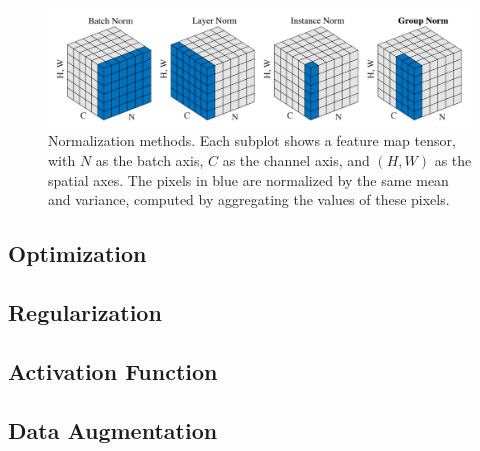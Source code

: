 \documentclass[a4paper]{article}
\theoremstyle{definition}
\theoremstyle{plain}
\begin{document}
\begin{figure}[H]
    \centering
    \includegraphics[scale=0.4]{figure/normalization.png}
    \caption{Normalization methods. Each subplot shows a feature map tensor, with $N$ as the batch axis, $C$ as the channel axis, and $(H, W)$ as the spatial axes. The pixels in blue are normalized by the same mean and variance, computed by aggregating the values of these pixels.}
    \label{fig:my_label}
\end{figure}

\subsection{Optimization}
\subsection{Regularization}
\subsection{Activation Function}
\subsection{Data Augmentation}
\end{document}
